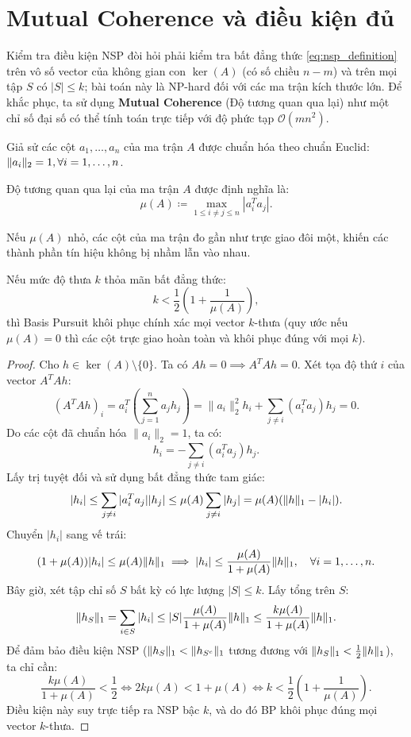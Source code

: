 \section{Mutual Coherence và điều kiện đủ}
Kiểm tra điều kiện NSP đòi hỏi phải kiểm tra bất đẳng thức \eqref{eq:nsp_definition} trên vô số vector của không gian con $\ker(A)$ (có số chiều $n - m$) và trên mọi tập $S$ có $|S| \le k$; bài toán này là NP-hard đối với các ma trận kích thước lớn. Để khắc phục, ta sử dụng \textbf{Mutual Coherence} (Độ tương quan qua lại) như một chỉ số đại số có thể tính toán trực tiếp với độ phức tạp $\mathcal{O}(m n^2)$.

Giả sử các cột $a_1, \dots, a_n$ của ma trận $A$ được chuẩn hóa theo chuẩn Euclid: $\|a_i\|_2 = 1, \forall i = 1, \dots, n$.

\begin{definition}
Độ tương quan qua lại của ma trận $A$ được định nghĩa là:
\begin{equation}
    \mu(A) \coloneqq \max_{1 \le i \ne j \le n} |a_i^T a_j|.
\end{equation}
\end{definition}

Nếu $\mu(A)$ nhỏ, các cột của ma trận đo gần như trực giao đôi một, khiến các thành phần tín hiệu không bị nhầm lẫn vào nhau.

\begin{theorem}
Nếu mức độ thưa $k$ thỏa mãn bất đẳng thức:
\begin{equation}
    k < \frac{1}{2} \left( 1 + \frac{1}{\mu(A)} \right),
    \label{eq:coherence_bound}
\end{equation}
thì Basis Pursuit khôi phục chính xác mọi vector $k$-thưa (quy ước nếu $\mu(A) = 0$ thì các cột trực giao hoàn toàn và khôi phục đúng với mọi $k$).
\end{theorem}

\begin{proof}
Cho $h \in \ker(A) \setminus \{0\}$. Ta có $Ah = 0 \implies A^T A h = 0$. Xét tọa độ thứ $i$ của vector $A^T A h$:
\[
(A^T A h)_i = a_i^T \left( \sum_{j=1}^n a_j h_j \right) = \|a_i\|_2^2 h_i + \sum_{j \ne i} (a_i^T a_j) h_j = 0.
\]
Do các cột đã chuẩn hóa $\|a_i\|_2 = 1$, ta có:
\[
h_i = -\sum_{j \ne i} (a_i^T a_j) h_j.
\]
Lấy trị tuyệt đối và sử dụng bất đẳng thức tam giác:
\[
|h_i| \le \sum_{j \ne i} |a_i^T a_j| |h_j| \le \mu(A) \sum_{j \ne i} |h_j| = \mu(A) (\|h\|_1 - |h_i|).
\]
Chuyển $|h_i|$ sang vế trái:
\[
(1 + \mu(A)) |h_i| \le \mu(A) \|h\|_1 \implies |h_i| \le \frac{\mu(A)}{1 + \mu(A)} \|h\|_1, \quad \forall i = 1, \dots, n.
\]
Bây giờ, xét tập chỉ số $S$ bất kỳ có lực lượng $|S| \le k$. Lấy tổng trên $S$:
\[
\|h_S\|_1 = \sum_{i \in S} |h_i| \le |S| \frac{\mu(A)}{1 + \mu(A)} \|h\|_1 \le \frac{k \mu(A)}{1 + \mu(A)} \|h\|_1.
\]
Để đảm bảo điều kiện NSP ($\|h_S\|_1 < \|h_{S^c}\|_1$ tương đương với $\|h_S\|_1 < \frac{1}{2} \|h\|_1$), ta chỉ cần:
\[
\frac{k \mu(A)}{1 + \mu(A)} < \frac{1}{2} \iff 2k \mu(A) < 1 + \mu(A) \iff k < \frac{1}{2} \left( 1 + \frac{1}{\mu(A)} \right).
\]
Điều kiện này suy trực tiếp ra NSP bậc $k$, và do đó BP khôi phục đúng mọi vector $k$-thưa.
\end{proof}

